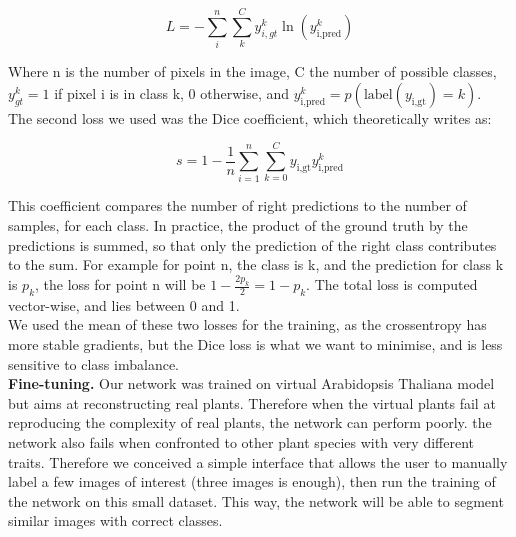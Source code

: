 \begin{equation}
    L =-\sum_i^n\sum_k^C{y^k_{i, gt}\ln(y_{\textrm{i}, \textrm{pred}}^k)}
\end{equation}

Where n is the number of pixels in the image, C the number of possible classes, $y_{gt}^k = 1$ if pixel i is in class k, 0 otherwise, and $y_ {\textrm{i}, \textrm{pred}}^k = p(\textrm{label}(y_{\textrm{i}, \textrm{gt}}) = k)$. \\

The second loss we used was the Dice coefficient, which theoretically writes as:

\begin{equation}
    s = 1 - \frac{1}{n}\sum_{i=1}^n\sum_{k=0}^{C}y_{\textrm{i}, \textrm{gt}} y_{\textrm{i}, \textrm{pred}}^k
\end{equation}


This coefficient compares the number of right predictions to the number of samples, for each class. In practice, the product of the ground truth by the predictions is summed, so that only the prediction of the right class contributes to the sum. For example for point n, the class is k, and the prediction for class k is $p_k$, the loss for point n will be $1 - \frac{2p_k}{2} = 1 - p_k$. The total loss is computed vector-wise, and lies between 0 and 1.\\

We used the mean of these two losses for the training, as the crossentropy has more stable gradients, but the Dice loss is what we want to minimise, and is less sensitive to class imbalance.\\



\textbf{Fine-tuning.}
Our network was trained on virtual Arabidopsis Thaliana model but aims at reconstructing real plants. Therefore when the virtual plants fail at reproducing the complexity of real plants, the network can perform poorly. the network also fails when confronted to other plant species with very different traits. Therefore we conceived a simple interface that allows the user to manually label a few images of interest (three images is enough), then run the training of the network on this small dataset. This way, the network will be able to segment similar images with correct classes. \\

